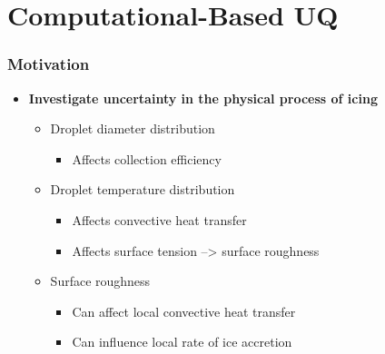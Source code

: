 \documentclass[9pt]{beamer}
\begin{document}
\section{Computational-Based UQ}
\label{sec-2}
\begin{frame}
\frametitle{Motivation}
\label{sec-2-1}

\begin{itemize}
\item \textbf{Investigate uncertainty in the physical process of icing}
\begin{itemize}
\item Droplet diameter distribution
\begin{itemize}
\item Affects collection efficiency
\end{itemize}
\item Droplet temperature distribution
\begin{itemize}
\item Affects convective heat transfer
\item Affects surface tension --> surface roughness
\end{itemize}
\item Surface roughness
\begin{itemize}
\item Can affect local convective heat transfer
\item Can influence local rate of ice accretion
\end{itemize}
\end{itemize}
\end{itemize}
\end{frame}
\end{document}
